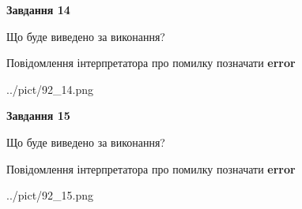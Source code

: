 \documentclass[11pt, ukrainian]{article}
\begin{document}
{\begin {large}
{\begin {center}\textbf{Завдання 14}\end {center}}\par
Що буде виведено за виконання? \par
Повідомлення інтерпретатора про помилку позначати \textbf{error}

\begin{center}
	{../pict/92_14.png}
\end{center}
\newpage

{\begin {center}\textbf{Завдання 15}\end {center}}\par
Що буде виведено за виконання? \par
Повідомлення інтерпретатора про помилку позначати \textbf{error}

\begin{center}
	{../pict/92_15.png}
\end{center}
\newpage

\end {large}}
\end{document}
